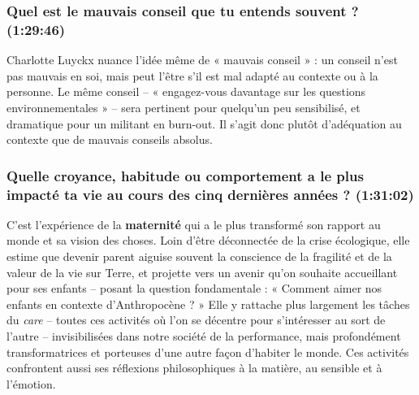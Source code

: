 \subsubsection{Quel est le mauvais conseil que tu entends souvent ? \textnormal{\small(1:29:46)}}

Charlotte Luyckx nuance l'idée même de « mauvais conseil » : un conseil n'est pas mauvais en soi, mais peut l'être s'il est mal adapté au contexte ou à la personne. Le même conseil -- « engagez-vous davantage sur les questions environnementales » -- sera pertinent pour quelqu'un peu sensibilisé, et dramatique pour un militant en burn-out. Il s'agit donc plutôt d'adéquation au contexte que de mauvais conseils absolus.

\subsubsection{Quelle croyance, habitude ou comportement a le plus impacté ta vie au cours des cinq dernières années ? \textnormal{\small(1:31:02)}}

C'est l'expérience de la \textbf{maternité} qui a le plus transformé son rapport au monde et sa vision des choses. Loin d'être déconnectée de la crise écologique, elle estime que devenir parent aiguise souvent la conscience de la fragilité et de la valeur de la vie sur Terre, et projette vers un avenir qu'on souhaite accueillant pour ses enfants -- posant la question fondamentale : « Comment aimer nos enfants en contexte d'Anthropocène ? » Elle y rattache plus largement les tâches du \textit{care} -- toutes ces activités où l'on se décentre pour s'intéresser au sort de l'autre -- invisibilisées dans notre société de la performance, mais profondément transformatrices et porteuses d'une autre façon d'habiter le monde. Ces activités confrontent aussi ses réflexions philosophiques à la matière, au sensible et à l'émotion.
